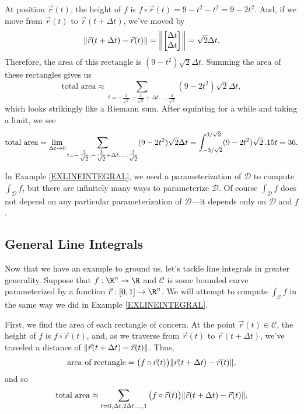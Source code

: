 \begin{example}
\begin{center}
	\end{center}
	
	At position
	$\vec r(t)$, the height of $f$ is $f\circ \vec r(t) = 9-t^2-t^2=9-2t^2$.
	And, if we move from $\vec r(t)$ to $\vec r(t+\Delta t)$, we've moved
	by
	\[
		\norm{\vec r(t+\Delta t) -\vec r(t)} = \norm*{\mat{\Delta t\\\Delta t}}
		=\sqrt{2}\Delta t.
	\]
	Therefore, the area of this rectangle is $(9-t^2)\sqrt{2} \Delta t$. 
	Summing the area of these rectangles gives us
	\[
		\text{total area} \approx \sum_{t=-\tfrac{3}{\sqrt{2}}, -\tfrac{3}{\sqrt{2}}+\Delta t,
		\ldots, \tfrac{3}{\sqrt{2}}} (9-2t^2)\sqrt{2} \Delta t,
	\]
	which looks strikingly like a Riemann sum.  After squinting for a while and
	taking a limit, we see
	\[
		\text{total area} =\lim_{\Delta t\to 0} \sum_{t=-\tfrac{3}{\sqrt{2}}, -\tfrac{3}{\sqrt{2}}+\Delta t,
		\ldots, \tfrac{3}{\sqrt{2}}} (9-2t^2)\sqrt{2} \Delta t
		= \int_{-3/\sqrt{2}}^{3/\sqrt{2}} (9-2t^2)\sqrt{2}\,.15 t = 36.
	\]
\end{example}

In Example \ref{EXLINEINTEGRAL}, we used a parameterization of $\mathcal D$ to
compute $\int_{\mathcal D} f$, but there are infinitely many ways
to parameterize $\mathcal D$.  Of course $\int_{\mathcal D} f$ does not depend
on any particular parameterization of $\mathcal D$---it depends only on $\mathcal D$
and $f$.


\subsection{General Line Integrals}
Now that we have an example to ground us, let's tackle line integrals in greater
generality.  Suppose that $f:\R^n\to\R$ and $\mathcal C$ is some bounded curve
parameterized by a function $\vec r:[0,1]\to\R^n$.  We will attempt to compute
$\int_{\mathcal C} f$ in the same way we did in Example \ref{EXLINEINTEGRAL}.

First, we find the area of each rectangle of concern.  At the point $\vec r(t)\in\mathcal C$,
the height of $f$ is $f\circ \vec r(t)$, and, as we traverse from $\vec r(t)$
to $\vec r(t+\Delta t)$, we've traveled a distance of $\lVert\vec r(t+\Delta t)-\vec r(t)\rVert$.
Thus, 
\[
	\text{area of rectangle} = \big(f\circ \vec r(t)\big)\lVert\vec r(t+\Delta t)-\vec r(t)\rVert,
\]
and so
\begin{equation}
	\label{EQLINEREIMANN}
	\text{total area} \approx \sum_{t=0,\Delta t, 2\Delta t, \ldots, 1}\big(f\circ \vec r(t)\big)\lVert\vec r(t+\Delta t)-\vec r(t)\rVert.
\end{equation}

